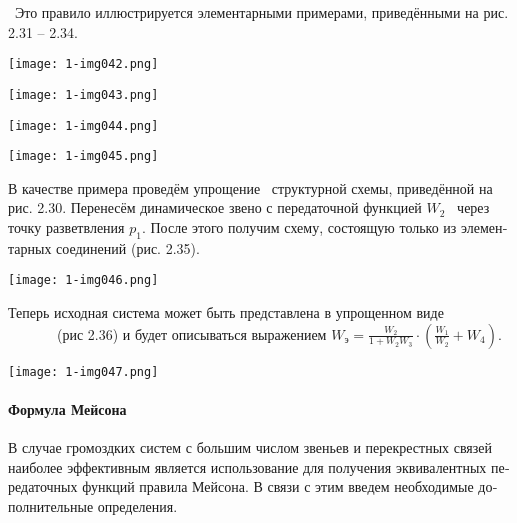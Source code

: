 \documentclass[a4paper]{article}
\begin{document}
{\begin{russian}\sffamily
\ Это правило иллюстрируется элементарными примерами, приведёнными на рис. 2.31 – 2.34. 
\end{russian}}


\bigskip


\bigskip

{\centering  \texttt{[image: 1-img042.png]} \par}
{\centering  \texttt{[image: 1-img043.png]} \par}

\bigskip


\bigskip


\bigskip


\bigskip

{\centering  \texttt{[image: 1-img044.png]} \par}

\bigskip

{\centering  \texttt{[image: 1-img045.png]} \par}

\bigskip

{\begin{russian}\sffamily
В качестве примера проведём упрощение \ структурной схемы, приведённой на рис. 2.30. Перенесём динамическое звено с
передаточной функцией  $W_2$ \ через точку разветвления  $p_1$. После этого получим схему, состоящую только из
элементарных соединений (рис. 2.35).
\end{russian}}


\bigskip


\bigskip

{\centering  \texttt{[image: 1-img046.png]} \par}
{\begin{russian}\sffamily
Теперь исходная система может быть представлена в упрощенном виде \ \ \ \ \ \ \ (рис 2.36) и будет описываться
выражением  $W_э=\frac{W_2}{1+W_2W_3}\cdot \left(\frac{W_1}{W_2}+W_4\right)$.
\end{russian}}


\bigskip


\bigskip

{\centering  \texttt{[image: 1-img047.png]} \par}
\paragraph{Формула Мейсона}
{\begin{russian}\sffamily
В случае громоздких систем с большим числом звеньев и перекрестных связей наиболее эффективным является использование
для получения эквивалентных передаточных функций правила Мейсона. В связи с этим введем необходимые дополнительные
определения.
\end{russian}}
\end{document}
